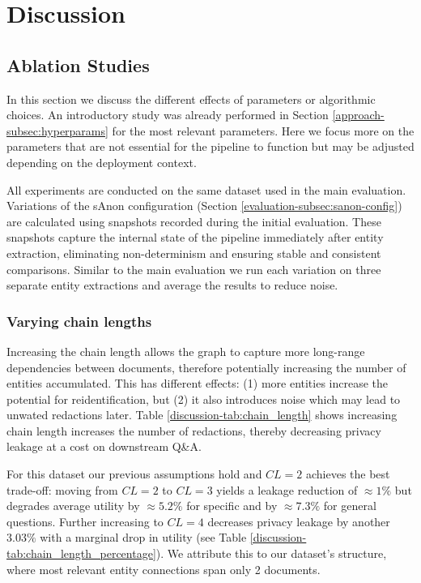 \chapter{Discussion}\label{chapter:discussion}
\section{Ablation Studies}
In this section we discuss the different effects of parameters or algorithmic choices. An introductory study was already performed in Section \ref{approach-subsec:hyperparams} for the most relevant parameters. Here we focus more on the parameters that are not essential for the pipeline to function  but may be adjusted depending on the deployment context.  

All experiments are conducted on the same dataset used in the main evaluation. Variations of the sAnon configuration (Section \ref{evaluation-subsec:sanon-config}) are calculated using snapshots recorded during the initial evaluation. These snapshots capture the internal state of the pipeline immediately after entity extraction, eliminating non-determinism and ensuring stable and consistent comparisons.  Similar to the main evaluation we run each variation on three separate entity extractions and average the results to reduce noise.


\subsection{Varying chain lengths}
Increasing the chain length allows the graph to capture more long-range dependencies between documents, therefore potentially increasing the number of entities accumulated. This has different effects: (1) more entities increase the potential for reidentification, but (2) it also introduces noise which may lead to unwated redactions later. Table \ref{discussion-tab:chain_length} shows increasing chain length increases the number of redactions, thereby decreasing privacy leakage at a cost on downstream Q\&A. 

For this dataset our previous assumptions hold and $CL = 2$ achieves the best trade-off: moving from $CL=2$ to $CL=3$ yields a leakage reduction of $\approx 1\%$ but degrades average utility by $\approx 5.2\%$ for specific and by $\approx 7.3\%$ for general questions. Further increasing to $CL=4$ decreases privacy leakage by another $3.03\%$ with a marginal drop in utility (see Table \ref{discussion-tab:chain_length_percentage}).  We attribute this to our dataset's structure, where most relevant entity connections span only 2 documents.

